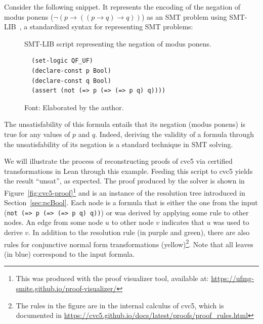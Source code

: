 Consider the following snippet. It represents the encoding of the negation of modus ponens
($\neg (p \rightarrow ((p \rightarrow q) \rightarrow q))$) as an SMT problem using SMT-LIB~\cite{smtlib},
a standardized syntax for representing SMT problems:

\begin{figure}[h]
\caption{SMT-LIB script representing the negation of modus ponens.}\label{negModusPonens}
\begin{verbatim}
  (set-logic QF_UF)
  (declare-const p Bool)
  (declare-const q Bool)
  (assert (not (=> p (=> (=> p q) q))))
\end{verbatim}
\caption*{Font: Elaborated by the author.}
\end{figure}

The unsatisfability of this formula entails that its negation (modus ponens) is true for any values of $p$ and $q$.
%
Indeed, deriving the validity of a formula through the unsatisfability of its negation is a standard technique in
SMT solving.

We will illustrate the process of reconstructing proofs of cvc5 via certified transformations
in Lean through this example. Feeding this script to cvc5 yields the result ``unsat'', as expected.
The proof produced by the solver is shown in Figure~\ref{fig:cvc5-proof}\footnote{This was produced with the proof visualizer tool, available at: \url{https://ufmg-smite.github.io/proof-visualizer/}} and is an instance of the resolution tree introduced in Section~\ref{sec:pcBool}.
Each node is a formula that is either the one from the input (\texttt{not (=> p (=> (=> p q) q))}) or was derived by applying some
rule to other nodes. An edge from some node $u$ to other node $v$ indicates that
$u$ was used to derive $v$.
In addition to the resolution rule (in purple and green), there are also rules for conjunctive normal form transformations (yellow)\footnote{The rules in the figure are in the internal calculus of cvc5, which is documented in \url{https://cvc5.github.io/docs/latest/proofs/proof_rules.html}}. Note that all leaves (in blue) correspond to the input formula.

\makeatletter
\setlength{\@fptop}{0pt}
\makeatother

